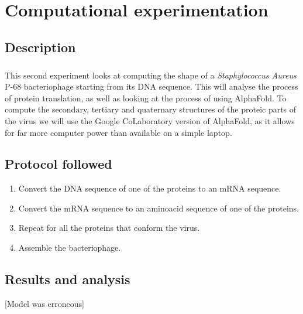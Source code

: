 \chapter{Computational experimentation}
\section{Description}
\paragraph{}This second experiment looks at computing the shape of a \emph{Staphylococcus Aureus} P-68 bacteriophage starting from its DNA sequence. This will analyse the process of protein translation, as well as looking at the process of using AlphaFold\cite{jumperHighlyAccurateProtein2021}. To compute the secondary, tertiary and quaternary structures of the proteic parts of the virus we will use the Google CoLaboratory version of AlphaFold\cite{GoogleColaboratoryAlpha1970}, as it allows for far more computer power than available on a simple laptop.
\section{Protocol followed}
\begin{enumerate}[label=\arabic*)]
\item Convert the DNA sequence of one of the proteins to an mRNA sequence.
\item Convert the mRNA sequence to an aminoacid sequence of one of the proteins.
\item Repeat for all the proteins that conform the virus.
\item Assemble the bacteriophage.
\end{enumerate}
\section{Results and analysis}
[Model was erroneous]